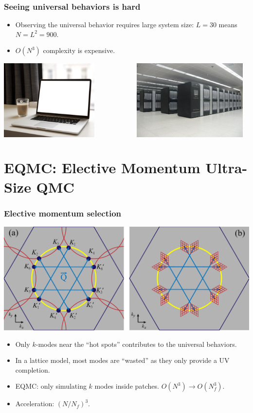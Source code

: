 \documentclass[xcolor=table, 10pt, aspectratio=43]{beamer}
\begin{document}
\begin{frame}
  \frametitle{Seeing universal behaviors is hard}
  \begin{itemize}
    \item Observing the universal behavior requires large system size: $L=30$ means $N=L^2=900$.
    \item \alert{$O(N^3)$} complexity is expensive.
  \end{itemize}
  \begin{center}
    \includegraphics[height=4cm]{laptop_coffee}
    ~~~~~~~~~~~
    \includegraphics[height=4cm]{tianhe}
  \end{center}
\end{frame}

\section{EQMC: Elective Momentum Ultra-Size QMC}

\begin{frame}
  \frametitle{Elective momentum selection}
  \begin{center}
    \includegraphics[width=.8\textwidth]{kmeshtri}
  \end{center}
\begin{itemize}
  \item Only $k$-modes near the ``hot spots'' contributes to the universal behaviors.
  \item In a lattice model, most modes are ``wasted'' as they only provide a UV completion.
  \item EQMC: only simulating $k$ modes inside patches.
  $O(N^3)\rightarrow O(N_f^3)$.
  \item Acceleration: $(N/N_f)^3$.
\end{itemize}
\end{frame}
\end{document}
